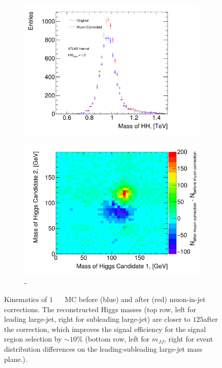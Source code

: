 \begin{figure}[htb!]
\begin{center}
    \captionsetup{justification=centering}
    \begin{subfigure}[b]{0.45\textwidth}
        \includegraphics[width=\textwidth]{figures/boosted/muons/hh_mass_dbl.pdf}
        \caption{\mtwoJ}
        \label{fig:boosted-muons-signal-mjj}
    \end{subfigure}
    \quad
    \begin{subfigure}[b]{0.45\textwidth}
        \includegraphics[width=\textwidth]{figures/boosted/muons/h12_corr_mass.pdf}
        \caption{\mleadJ-\msublJ}
        \label{fig:boosted-muons-signal-mj2d}
    \end{subfigure}
  \caption{Kinematics of $1$\TeV~ \Grav~ MC before (blue) and after (red) muon-in-jet corrections. The reconstructed Higgs masses (top row, left for leading large-\R jet, right for subleading large-\R jet) are closer to $125$\GeV after the correction, which improves the signal efficiency for the signal region selection by $\sim\!10\%$ (bottom row, left for $m_{JJ}$, right for event distribution differences on the leading-subleading large-\R jet mass plane.).}
  \label{fig:boosted-muons-signal}
\end{center}
\end{figure}

